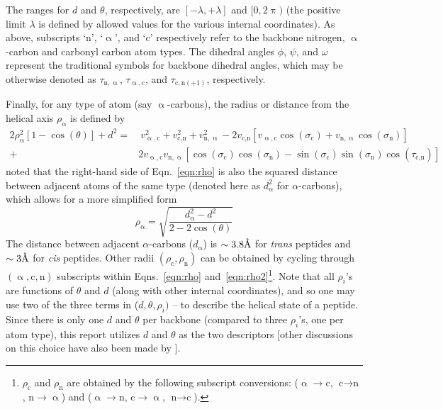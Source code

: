 \documentclass[fleqn,10pt,lineno]{wlpeerj} %
\newcommand{\n}[1]{{\color{black}#1}} %
\newcommand{\Eqn}[1]{Eqn.~\ref{#1}}
\newcommand{\Eqns}[1]{Eqns.~\ref{#1}}
\newcommand{\cis}{{\em{cis}}\xspace}
\newcommand{\trans}{{\em{trans}}\xspace}
\begin{document}
The ranges for $d$ and $\theta$, respectively, are $[-\lambda,+\lambda]$ and $[0,2\uppi)$ (the positive limit $\lambda$ is defined by allowed values for the various internal coordinates). As above, subscripts `$\textrm{n}$', `$\upalpha$', and `$\textrm{c}$' respectively refer to the backbone nitrogen, $\upalpha$-carbon and carbonyl carbon atom \n{types}. %
The dihedral angles $\phi$, $\psi$, and $\omega$ represent the traditional  symbols for backbone dihedral angles, which may be otherwise denoted as $\tau_{\textrm{n},\upalpha}$, $\tau_{\upalpha,\textrm{c}}$, and $\tau_{\textrm{c},\textrm{n}(+1)}$, respectively. 

Finally, for any type of atom (say $\upalpha$-carbons), the radius or distance from the helical axis $\rho_\upalpha$ is defined by
\begin{align} 
2 \rho_\upalpha^2 \left[1 - \cos(\theta)\right] + d^2 = & ~v_{\upalpha,\textrm{c}}^2 + v_{\textrm{c},\textrm{n}}^2 + v_{\textrm{n},\upalpha}^2 - 2 v_{\textrm{c},\textrm{n}}\left[v_{\upalpha,\textrm{c}}\cos(\sigma_\textrm{c}) + v_{\textrm{n},\upalpha}\cos(\sigma_\textrm{n})\right] \nonumber \\
                                                  + & 2 v_{\upalpha,\textrm{c}} v_{\textrm{n},\upalpha}\left[\cos(\sigma_\textrm{c})\cos(\sigma_\textrm{n}) - \sin(\sigma_\textrm{c})\sin(\sigma_\textrm{n})\cos(\tau_{\textrm{c},\textrm{n}})\right]
\label{eqn:rho}
\end{align}
\cite{Miyazawa1961} noted that the right-hand side of \Eqn{eqn:rho} is also the squared distance between adjacent atoms of the same type (denoted here as $d_\upalpha^2$ for $\alpha$-carbons), which allows for a more simplified form
\begin{equation}
\label{eqn:rho2}
\rho_\upalpha = \sqrt{\frac{d_\upalpha^2 - d^2}{2-2\cos(\theta)}}
\end{equation}
The distance between adjacent $\alpha$-carbons ($d_\upalpha$) is $\sim 3.8\textrm\AA$ for \trans peptides and $\sim 3\textrm\AA$ for \cis peptides. Other radii $(\rho_\textrm{c}, \rho_\textrm{n})$ can be obtained by cycling through $(\upalpha,\textrm{c},\textrm{n})$ subscripts within \Eqns{eqn:rho} and~\ref{eqn:rho2}\footnote{$\rho_\textrm{c}$ and $\rho_\textrm{n}$ are obtained by the following subscript conversions: ($\upalpha \to \textrm{c}$, $\textrm{c} \to \textrm{n}$, $\textrm{n} \to \upalpha$) and ($\upalpha \to \textrm{n}$, $\textrm{c} \to \upalpha$, $\textrm{n} \to \textrm{c}$).}. Note that all $\rho_i$'s are functions of $\theta$ \n{and} $d$ (along with other internal coordinates), and so one may use two of the three terms \n{in} ($d,\theta,\rho_i)$ -- to describe the helical state of a peptide. Since there is only one $d$ and $\theta$ per backbone (compared to three $\rho_i$'s, one per atom type), this report utilizes $d$ and $\theta$ as the two descriptors [\n{other} discussions on this choice have also been made by \cite{Zacharias2013}].
\end{document}
